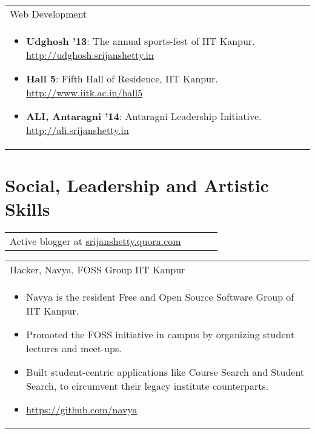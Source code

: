 \documentclass[a4paper,10pt]{article} %
\newcommand{\projectlist}[2]{
    \begin{tabular}{p{\linewidth}}
        \textcolor{NavyBlue}{#1}\\
        \vspace{-0.3cm}
        \footnotesize{#2}
    \end{tabular}
    \vspace{-0.4cm}
}
\newcommand{\skill}[2]{
    \begin{tabular}{p{0.85\linewidth}r}
        #2 & \multicolumn{1}{m{3cm}}{\raggedleft \textsc{#1}}\\
    \end{tabular}
    \vspace{-0.5cm}
}
\begin{document}
\projectlist {Web Development}
             {
                 \begin{itemize}[leftmargin=0.5cm]
                     \item \textbf{Udghosh '13}: The annual sports-fest of IIT Kanpur.
                         \href{http://udghosh.srijanshetty.in}{http://udghosh.srijanshetty.in}
                     \item \textbf{Hall 5}: Fifth Hall of Residence, IIT Kanpur.
                         \href{http://www.iitk.ac.in/hall5} {http://www.iitk.ac.in/hall5}
                     \item \textbf{ALI, Antaragni '14}: Antaragni Leadership Initiative.
                         \href{http://ali.srijanshetty.in} {http://ali.srijanshetty.in}
                 \end{itemize}
             }


\section {Social, Leadership and Artistic Skills}

\skill {}
       {Active blogger at \href{srijanshetty.quora.com} {srijanshetty.quora.com}}

\projectlist {Hacker, Navya, FOSS Group IIT Kanpur}
             {
                   \begin{itemize}[leftmargin=0.5cm]
                       \item Navya is the resident Free and Open Source Software Group of IIT Kanpur.
                       \item Promoted the FOSS initiative in campus by organizing student lectures and meet-ups.
                       \item Built student-centric applications like Course Search and Student Search, to circumvent
                           their legacy institute counterparts.
                       \item \href{https://github.com/navya} {https://github.com/navya}
                   \end{itemize}
             }
\end{document}
